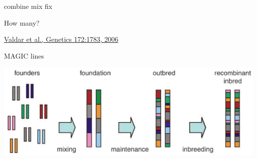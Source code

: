 \documentclass[12pt]{article}
\newcommand{\headsize}{\fontsize{35}{35} \selectfont}
\newcommand{\smallsize}{\fontsize{25}{30} \selectfont}
\newcommand{\smallersize}{\fontsize{20}{25} \selectfont}
\newcommand{\citesize}{\fontsize{14}{18} \selectfont}
\begin{document}
\smallsize \color{myyellow}
\hspace*{52mm} combine \hspace*{35mm} mix \hspace*{52mm} fix

\smallersize
\color{mywhite}
\vspace{20pt}

\hspace*{6mm}
\begin{minipage}[t]{45mm}
\vspace*{0mm}
\centering

How many? \\[20pt]

\end{minipage}
\hspace{57mm}
\begin{minipage}[t]{45mm}
\vspace*{0mm}
\centering


\end{minipage}
\hspace{18mm}
\begin{minipage}[t]{45mm}
\vspace*{0mm}
\centering


\end{minipage}


\vfill

\hfill {\citesize \color{citecolor} \href{http://www.genetics.org/content/172/3/1783.full}{Valdar et al., Genetics 172:1783, 2006}}

\vspace*{5mm}


\newpage

\addtocounter{page}{-1}

\headsize \color{myyellow}
\hfill \begin{minipage}{5.75in}
\centering
MAGIC lines
\end{minipage}

\vspace{20mm}

\centerline{\includegraphics[width=10in]{Figs/valdar_genet2006.png}}
\end{document}
